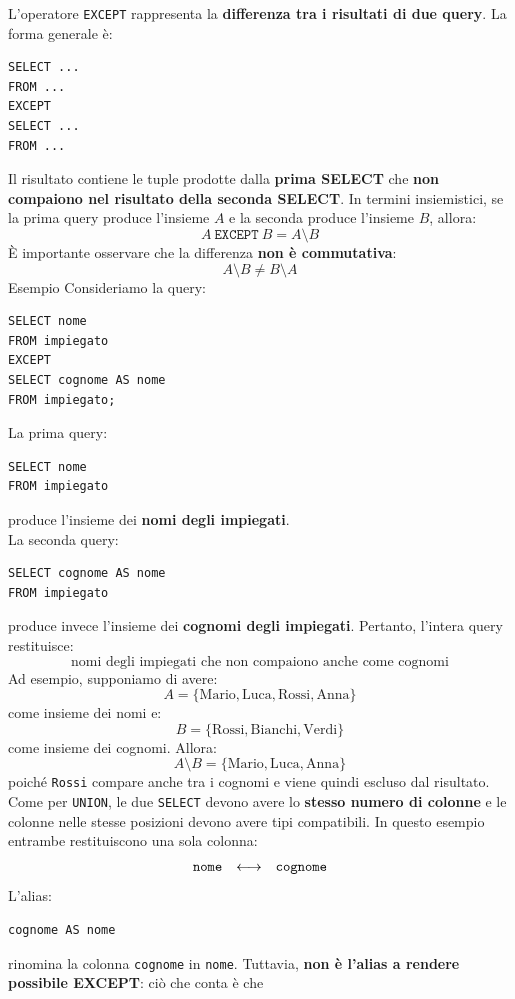 L'operatore \texttt{EXCEPT} rappresenta la \textbf{differenza tra i risultati
di due query}.
La forma generale è:
\begin{verbatim}
SELECT ...
FROM ...
EXCEPT
SELECT ...
FROM ...
\end{verbatim}
\noindent Il risultato contiene le tuple prodotte dalla \textbf{prima SELECT} che
\textbf{non compaiono nel risultato della seconda SELECT}.
In termini insiemistici, se la prima query produce l'insieme $A$ e la
seconda produce l'insieme $B$, allora:
\[
A \ \texttt{EXCEPT} \ B = A \setminus B
\]
È importante osservare che la differenza \textbf{non è commutativa}:
\[
A \setminus B \neq B \setminus A
\]
\textcolor{verdeEsempio}{Esempio}
Consideriamo la query:
\begin{verbatim}
SELECT nome
FROM impiegato
EXCEPT
SELECT cognome AS nome
FROM impiegato;
\end{verbatim}
\noindent La prima query:
\begin{verbatim}
SELECT nome
FROM impiegato
\end{verbatim}
\noindent produce l'insieme dei \textbf{nomi degli impiegati}.\\
La seconda query:
\begin{verbatim}
SELECT cognome AS nome
FROM impiegato
\end{verbatim}
\noindent produce invece l'insieme dei \textbf{cognomi degli impiegati}.
Pertanto, l'intera query restituisce:
\[
\boxed{
\text{nomi degli impiegati che non compaiono anche come cognomi}
}
\]
Ad esempio, supponiamo di avere:
\[
A =
\{\text{Mario},\text{Luca},\text{Rossi},\text{Anna}\}
\]
come insieme dei nomi e:
\[
B =
\{\text{Rossi},\text{Bianchi},\text{Verdi}\}
\]
come insieme dei cognomi.
Allora:
\[
A \setminus B =
\{\text{Mario},\text{Luca},\text{Anna}\}
\]
poiché \texttt{Rossi} compare anche tra i cognomi e viene quindi escluso
dal risultato.\\
Come per \texttt{UNION}, le due \texttt{SELECT} devono avere lo
\textbf{stesso numero di colonne} e le colonne nelle stesse posizioni
devono avere tipi compatibili.
In questo esempio entrambe restituiscono una sola colonna:
\[
\begin{array}{ccc}
\text{\texttt{nome}} & \longleftrightarrow & \text{\texttt{cognome}}
\end{array}
\]
L'alias:
\begin{verbatim}
cognome AS nome
\end{verbatim}
\noindent rinomina la colonna \texttt{cognome} in \texttt{nome}. Tuttavia,
\textbf{non è l'alias a rendere possibile EXCEPT}: ciò che conta è che
